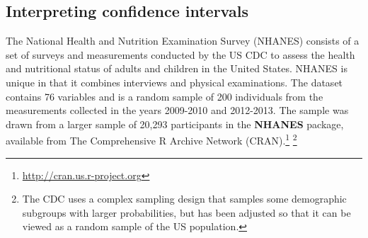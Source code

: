 \begin{spacing}{1.5}

\subsection{Interpreting confidence intervals}
\label{interpretingCIs}


The National Health and Nutrition Examination Survey (NHANES) consists of a set of surveys and measurements conducted by the US CDC to assess the health and nutritional status of adults and children in the United States. NHANES is unique in that it combines interviews and physical examinations.  The dataset  contains 76 variables and is a random sample of 200 individuals from the measurements collected in the years 2009-2010 and 2012-2013. The sample was drawn from a larger sample of 20,293 participants in the \textbf{NHANES} package, available from The Comprehensive R Archive Network (CRAN).\footnote{\url{http://cran.us.r-project.org}} \footnote{The CDC uses a complex sampling design that samples some demographic subgroups with larger probabilities, but  has been adjusted so that it can be viewed as a random sample of the US population.}  


\end{spacing}
